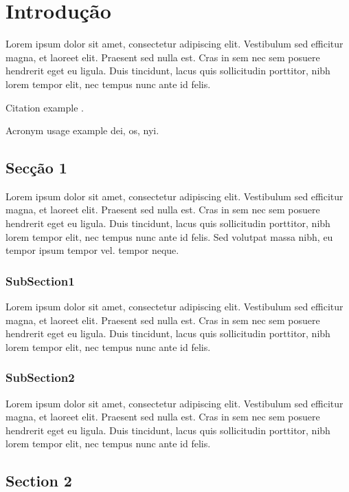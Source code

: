 \chapter{Introdução}

Lorem ipsum dolor sit amet, consectetur adipiscing elit. Vestibulum sed efficitur magna, et laoreet elit. Praesent sed nulla est. Cras in sem nec sem posuere hendrerit eget eu ligula. Duis tincidunt, lacus quis sollicitudin porttitor, nibh lorem tempor elit, nec tempus nunc ante id felis.

Citation example \cite{oppenheimer_why_2003}. 

Acronym usage example \gls{dei}, \gls{os}, \gls{nyi}.


\section{Secção 1}
\label{subsec:sec1}

Lorem ipsum dolor sit amet, consectetur adipiscing elit. Vestibulum sed efficitur magna, et laoreet elit. Praesent sed nulla est. Cras in sem nec sem posuere hendrerit eget eu ligula. Duis tincidunt, lacus quis sollicitudin porttitor, nibh lorem tempor elit, nec tempus nunc ante id felis. Sed volutpat massa nibh, eu tempor ipsum tempor vel. tempor neque.

\subsection{SubSection1}

Lorem ipsum dolor sit amet, consectetur adipiscing elit. Vestibulum sed efficitur magna, et laoreet elit. Praesent sed nulla est. Cras in sem nec sem posuere hendrerit eget eu ligula. Duis tincidunt, lacus quis sollicitudin porttitor, nibh lorem tempor elit, nec tempus nunc ante id felis.

\subsection{SubSection2}

Lorem ipsum dolor sit amet, consectetur adipiscing elit. Vestibulum sed efficitur magna, et laoreet elit. Praesent sed nulla est. Cras in sem nec sem posuere hendrerit eget eu ligula. Duis tincidunt, lacus quis sollicitudin porttitor, nibh lorem tempor elit, nec tempus nunc ante id felis.

\section{Section 2}
\label{subsec:sec2}

